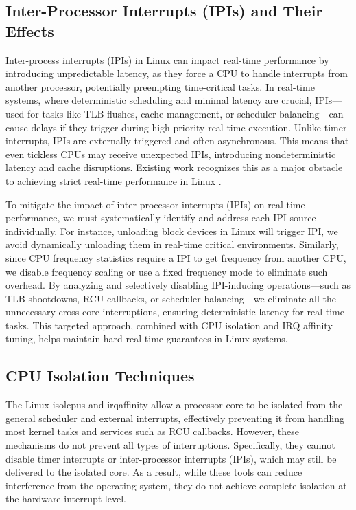 \documentclass[letterpaper]{article}
\begin{document}
\subsection{Inter-Processor Interrupts (IPIs) and Their Effects}
Inter-process interrupts (IPIs) in Linux can impact real-time performance by introducing
unpredictable latency, as they force a CPU to handle interrupts from another processor,
potentially preempting time-critical tasks. In real-time systems, where deterministic scheduling
and minimal latency are crucial, IPIs—used for tasks like TLB flushes, cache management, or
scheduler balancing—can cause delays if they trigger during high-priority real-time execution.
Unlike timer interrupts, IPIs are externally triggered and often asynchronous. This means that even
tickless CPUs may receive unexpected IPIs, introducing nondeterministic latency and cache
disruptions. Existing work recognizes this as a major obstacle to achieving strict real-time
performance in Linux \cite{YuxinRen}.


To mitigate the impact of inter-processor interrupts (IPIs) on real-time performance, we must
systematically identify and address each IPI source individually. For instance, unloading block
devices in Linux will trigger IPI, we avoid dynamically unloading them in real-time critical
environments. Similarly, since CPU frequency statistics require a IPI to get frequency from another
CPU, we disable frequency scaling or use a fixed frequency mode to eliminate such overhead. By
analyzing and selectively disabling IPI-inducing operations—such as TLB shootdowns, RCU
callbacks, or scheduler balancing—we eliminate all the unnecessary cross-core interruptions,
ensuring deterministic latency for real-time tasks. This targeted approach, combined with CPU
isolation and IRQ affinity tuning, helps maintain hard real-time guarantees in Linux systems.


\subsection{CPU Isolation Techniques}
The Linux isolcpus and irqaffinity \cite{KernelDocParam} allow a processor core to be isolated from the general
scheduler and external interrupts, effectively preventing it from handling most kernel tasks and
services such as RCU callbacks. However, these mechanisms do not prevent all types of
interruptions. Specifically, they cannot disable timer interrupts or inter-processor interrupts (IPIs),
which may still be delivered to the isolated core. As a result, while these tools can reduce
interference from the operating system, they do not achieve complete isolation at the hardware
interrupt level.
\end{document}
